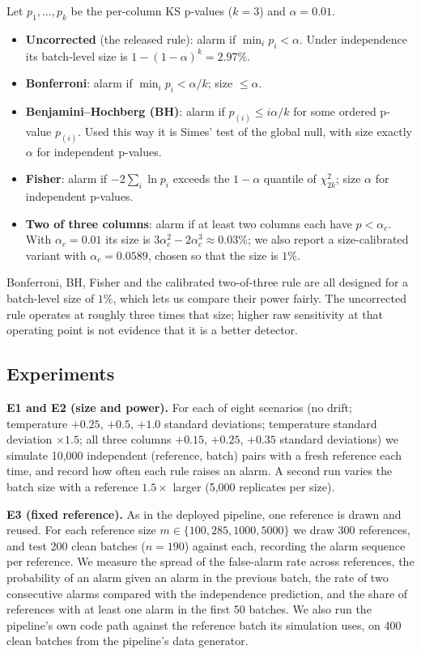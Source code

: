 \documentclass[11pt]{article}
\begin{document}
Let $p_1,\dots,p_k$ be the per-column KS p-values ($k=3$) and $\alpha=0.01$.
\begin{itemize}
    \item \textbf{Uncorrected} (the released rule): alarm if $\min_i p_i<\alpha$. Under independence its batch-level size is $1-(1-\alpha)^k=2.97\%$.
    \item \textbf{Bonferroni}: alarm if $\min_i p_i<\alpha/k$; size $\le\alpha$.
    \item \textbf{Benjamini--Hochberg (BH)}: alarm if $p_{(i)}\le i\alpha/k$ for some ordered p-value $p_{(i)}$. Used this way it is Simes' test of the global null, with size exactly $\alpha$ for independent p-values.
    \item \textbf{Fisher}: alarm if $-2\sum_i\ln p_i$ exceeds the $1-\alpha$ quantile of $\chi^2_{2k}$; size $\alpha$ for independent p-values.
    \item \textbf{Two of three columns}: alarm if at least two columns each have $p<\alpha_c$. With $\alpha_c=0.01$ its size is $3\alpha_c^2-2\alpha_c^3\approx0.03\%$; we also report a size-calibrated variant with $\alpha_c=0.0589$, chosen so that the size is $1\%$.
\end{itemize}
Bonferroni, BH, Fisher and the calibrated two-of-three rule are all designed for a batch-level size of $1\%$, which lets us compare their power fairly. The uncorrected rule operates at roughly three times that size; higher raw sensitivity at that operating point is not evidence that it is a better detector.

\subsection{Experiments}

\textbf{E1 and E2 (size and power).} For each of eight scenarios (no drift; temperature $+0.25$, $+0.5$, $+1.0$ standard deviations; temperature standard deviation $\times1.5$; all three columns $+0.15$, $+0.25$, $+0.35$ standard deviations) we simulate 10{,}000 independent (reference, batch) pairs with a fresh reference each time, and record how often each rule raises an alarm. A second run varies the batch size with a reference $1.5\times$ larger (5{,}000 replicates per size).

\textbf{E3 (fixed reference).} As in the deployed pipeline, one reference is drawn and reused. For each reference size $m\in\{100,285,1000,5000\}$ we draw 300 references, and test 200 clean batches ($n=190$) against each, recording the alarm sequence per reference. We measure the spread of the false-alarm rate across references, the probability of an alarm given an alarm in the previous batch, the rate of two consecutive alarms compared with the independence prediction, and the share of references with at least one alarm in the first 50 batches. We also run the pipeline's own code path against the reference batch its simulation uses, on 400 clean batches from the pipeline's data generator.
\end{document}
